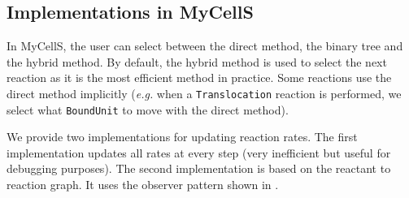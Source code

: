 \subsection{Implementations in MyCellS}

In MyCellS, the user can select between the direct method, the binary tree and
the hybrid method.
By default, the hybrid method is used to select the next reaction as it is the
most efficient method in practice.
Some reactions use the direct method implicitly
(\textit{e.g.} when a \texttt{Translocation} reaction is performed,
we select what \texttt{BoundUnit} to move with the direct method).

We provide two implementations for updating reaction rates.
The first implementation updates all rates at every step
(very inefficient but useful for debugging purposes).
The second implementation is based on the reactant to reaction graph.
It uses the observer pattern shown in .
